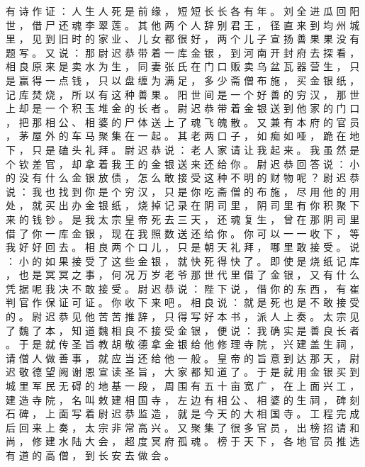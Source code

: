 {有 诗 作 证 ： 人 生 人 死 是 前 缘 ， 短 短 长 长 各 有 年 。
刘 全 进 瓜 回 阳 世 ， 借 尸 还 魂 李 翠 莲 。
其 他 两 个 人 辞 别 君 王 ， 径 直 来 到 均 州 城 里 ， 见 到 旧 时 的 家 业 、 儿 女 都 很 好 ， 两 个 儿 子 宣 扬 善 果 果 没 有 题 写 。
又 说 ： 那 尉 迟 恭 带 着 一 库 金 银 ， 到 河 南 开 封 府 去 探 看 ， 相 良 原 来 是 卖 水 为 生 ， 同 妻 张 氏 在 门 口 贩 卖 乌 盆 瓦 器 营 生 ， 只 是 赢 得 一 点 钱 ， 只 以 盘 缠 为 满 足 ， 多 少 斋 僧 布 施 ， 买 金 银 纸 ， 记 库 焚 烧 ， 所 以 有 这 种 善 果 。
阳 世 间 是 一 个 好 善 的 穷 汉 ， 那 世 上 却 是 一 个 积 玉 堆 金 的 长 者 。
尉 迟 恭 带 着 金 银 送 到 他 家 的 门 口 ， 把 那 相 公 、 相 婆 的 尸 体 送 上 了 魂 飞 魄 散 。
又 兼 有 本 府 的 官 员 ， 茅 屋 外 的 车 马 聚 集 在 一 起 。
其 老 两 口 子 ， 如 痴 如 哑 ， 跪 在 地 下 ， 只 是 磕 头 礼 拜 。
尉 迟 恭 说 ： 老 人 家 请 让 我 起 来 。
我 虽 然 是 个 钦 差 官 ， 却 拿 着 我 王 的 金 银 送 来 还 给 你 。
尉 迟 恭 回 答 说 ： 小 的 没 有 什 么 金 银 放 债 ， 怎 么 敢 接 受 这 种 不 明 的 财 物 呢 ？ 尉 迟 恭 说 ： 我 也 找 到 你 是 个 穷 汉 ， 只 是 你 吃 斋 僧 的 布 施 ， 尽 用 他 的 用 处 ， 就 买 出 办 金 银 纸 ， 烧 掉 记 录 在 阴 司 里 ， 阴 司 里 有 你 积 聚 下 来 的 钱 钞 。
是 我 太 宗 皇 帝 死 去 三 天 ， 还 魂 复 生 ， 曾 在 那 阴 司 里 借 了 你 一 库 金 银 ， 现 在 我 照 数 送 还 给 你 。
你 可 以 一 一 收 下 ， 等 我 好 好 回 去 。
相 良 两 个 口 儿 ， 只 是 朝 天 礼 拜 ， 哪 里 敢 接 受 。
说 ： 小 的 如 果 接 受 了 这 些 金 银 ， 就 快 死 得 快 了 。
即 使 是 烧 纸 记 库 ， 也 是 冥 冥 之 事 ， 何 况 万 岁 老 爷 那 世 代 里 借 了 金 银 ， 又 有 什 么 凭 据 呢 我 决 不 敢 接 受 。
尉 迟 恭 说 ： 陛 下 说 ， 借 你 的 东 西 ， 有 崔 判 官 作 保 证 可 证 。
你 收 下 来 吧 。
相 良 说 ： 就 是 死 也 是 不 敢 接 受 的 。
尉 迟 恭 见 他 苦 苦 推 辞 ， 只 得 写 好 本 书 ， 派 人 上 奏 。
太 宗 见 了 魏 了 本 ， 知 道 魏 相 良 不 接 受 金 银 ， 便 说 ： 我 确 实 是 善 良 长 者 。
于 是 就 传 圣 旨 教 胡 敬 德 拿 金 银 给 他 修 理 寺 院 ， 兴 建 盖 生 祠 ， 请 僧 人 做 善 事 ， 就 应 当 还 给 他 一 般 。
皇 帝 的 旨 意 到 达 那 天 ， 尉 迟 敬 德 望 阙 谢 恩 宣 读 圣 旨 ， 大 家 都 知 道 了 。
于 是 就 用 金 银 买 到 城 里 军 民 无 碍 的 地 基 一 段 ， 周 围 有 五 十 亩 宽 广 ， 在 上 面 兴 工 ， 建 造 寺 院 ， 名 叫 敕 建 相 国 寺 ， 左 边 有 相 公 、 相 婆 的 生 祠 ， 碑 刻 石 碑 ， 上 面 写 着 尉 迟 恭 监 造 ， 就 是 今 天 的 大 相 国 寺 。
工 程 完 成 后 回 来 上 奏 ， 太 宗 非 常 高 兴 。
又 聚 集 了 很 多 官 员 ， 出 榜 招 请 和 尚 ， 修 建 水 陆 大 会 ， 超 度 冥 府 孤 魂 。
榜 于 天 下 ， 各 地 官 员 推 选 有 道 的 高 僧 ， 到 长 安 去 做 会 。
}
